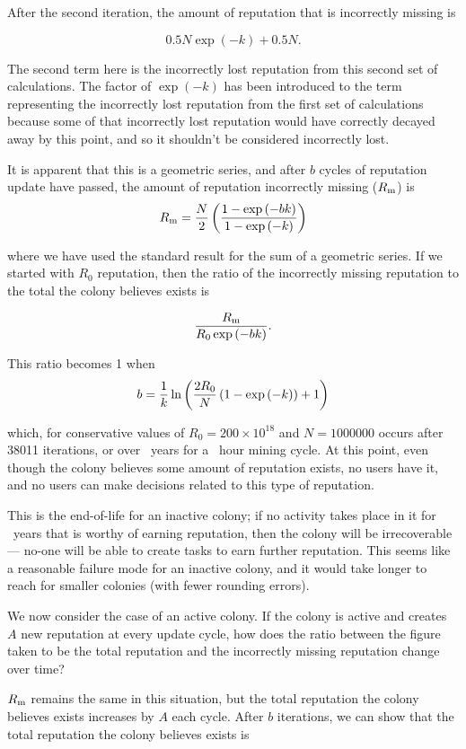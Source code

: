 After the second iteration, the amount of reputation that is incorrectly missing is

$$0.5N\exp\left(-k\right) + 0.5N.$$

The second term here is the incorrectly lost reputation from this second set of calculations. The factor of $\exp\left(-k\right)$ has been introduced to the term representing the incorrectly lost reputation from the first set of calculations because some of that incorrectly lost reputation would have correctly decayed away by this point, and so it shouldn't be considered incorrectly lost.

It is apparent that this is a geometric series, and after $b$ cycles of reputation update have passed, the amount of reputation incorrectly missing ($R_{\rm m}$) is
$$R_{\rm m} = \frac{N}{2} \left(\frac{1-\exp\left(-bk\right)}{1-\exp\left(-k\right)}\right)$$

\noindent where we have used the standard result for the sum of a geometric series. If we started with $R_0$ reputation, then the ratio of the incorrectly missing reputation to the total the colony believes exists is

$$\frac{R_{\rm m}}{R_0\exp\left(-bk\right)}.$$

This ratio becomes 1 when
$$ b = \frac{1}{k}\ln\left(\frac{2R_{\rm 0}}{N}\left(1-\exp\left(-k\right)\right) +1   \right)$$

\noindent which, for conservative values of $R_0 = 200\times10^{18}$ and $N=1000000$ occurs after 38011 iterations, or over \timetofail\ years for a \miningcycleduration\ hour mining cycle. At this point, even though the colony believes some amount of reputation exists, no users have it, and no users can make decisions related to this type of reputation.

This is the end-of-life for an inactive colony; if no activity takes place in it for \timetofail\ years that is worthy of earning reputation, then the colony will be irrecoverable --- no-one will be able to create tasks to earn further reputation. This seems like a reasonable failure mode for an inactive colony, and it would take longer to reach for smaller colonies (with fewer rounding errors).

We now consider the case of an active colony. If the colony is active and creates $A$ new reputation at every update cycle, how does the ratio between the figure taken to be the total reputation and the incorrectly missing reputation change over time?

$R_{\rm m}$ remains the same in this situation, but the total reputation the colony believes exists increases by $A$ each cycle. After $b$ iterations, we can show that the total reputation the colony believes exists is

